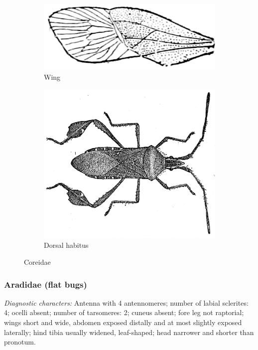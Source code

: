 \documentclass[letterpaper, 11pt]{article}
\begin{document}
\begin{figure}[ht!]
 \centering
 \begin{subfigure}[ht!]{0.3\textwidth}
  \includegraphics[width=\textwidth]{coreidWing.png}
  \caption{Wing \citep[][Fig. 139-4]{bhlitem16791elementary}}
  \label{fig:coreid2}
 \end{subfigure}
 \hfill
  \begin{subfigure}[ht!]{0.45\textwidth}
  \includegraphics[width=\textwidth]{coreidae.png}
  \caption{Dorsal habitus \citep[][Fig. 9]{chittenden1899some}}
  \label{fig:coreid1}
 \end{subfigure}
 \caption{Coreidae}\label{fig:coreids}
\end{figure}


\subsubsection{Aradidae (flat bugs)}
\noindent{}\textit{Diagnostic characters:} Antenna with 4 antennomeres; number of labial sclerites: 4; ocelli absent; number of tarsomeres: 2; cuneus absent; fore leg not raptorial; wings short and wide, abdomen exposed distally and at most slightly exposed laterally; hind tibia usually widened, leaf-shaped; head narrower and shorter than pronotum.\\
\end{document}
